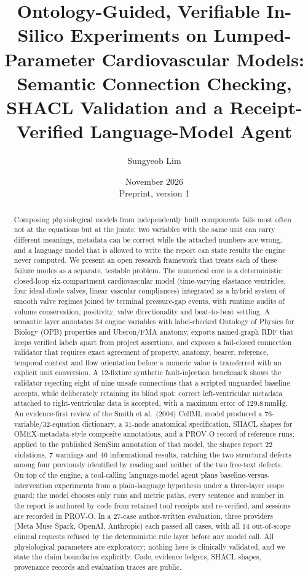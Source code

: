 \documentclass[11pt,letterpaper]{article}
\title{\textbf{Ontology-Guided, Verifiable In-Silico Experiments on Lumped-Parameter Cardiovascular Models:\\ Semantic Connection Checking, SHACL Validation and a Receipt-Verified Language-Model Agent}}
\author[1]{Sungyeob Lim}
\affil[1]{College of Medicine, Soonchunhyang University, Republic of Korea}
\date{November 2026 \\ \small Preprint, version 1}
\begin{document}
\maketitle

\begin{abstract}
Composing physiological models from independently built components fails most often not at the equations but at the joints: two variables with the same unit can carry different meanings, metadata can be correct while the attached numbers are wrong, and a language model that is allowed to write the report can state results the engine never computed. We present an open research framework that treats each of these failure modes as a separate, testable problem. The numerical core is a deterministic closed-loop six-compartment cardiovascular model (time-varying elastance ventricles, four ideal-diode valves, linear vascular compliances) integrated as a hybrid system of smooth valve regimes joined by terminal pressure-gap events, with runtime audits of volume conservation, positivity, valve directionality and beat-to-beat settling. A semantic layer annotates 34 engine variables with label-checked Ontology of Physics for Biology (OPB) properties and Uberon/FMA anatomy, exports named-graph RDF that keeps verified labels apart from project assertions, and exposes a fail-closed connection validator that requires exact agreement of property, anatomy, bearer, reference, temporal context and flow orientation before a numeric value is transferred with an explicit unit conversion. A 12-fixture synthetic fault-injection benchmark shows the validator rejecting eight of nine unsafe connections that a scripted unguarded baseline accepts, while deliberately retaining its blind spot: correct left-ventricular metadata attached to right-ventricular data is accepted, with a maximum error of 129.8\,mmHg. An evidence-first review of the Smith et al.\ (2004) CellML model produced a 76-variable/32-equation dictionary, a 31-node anatomical specification, SHACL shapes for OMEX-metadata-style composite annotations, and a PROV-O record of reference runs; applied to the published SemSim annotation of that model, the shapes report 22 violations, 7 warnings and 46 informational results, catching the two structural defects among four previously identified by reading and neither of the two free-text defects. On top of the engine, a tool-calling language-model agent plans baseline-versus-intervention experiments from a plain-language hypothesis under a three-layer scope guard; the model chooses only runs and metric paths, every sentence and number in the report is authored by code from retained tool receipts and re-verified, and sessions are recorded in PROV-O. In a 27-case author-written evaluation, three providers (Meta Muse Spark, OpenAI, Anthropic) each passed all cases, with all 14 out-of-scope clinical requests refused by the deterministic rule layer before any model call. All physiological parameters are exploratory; nothing here is clinically validated, and we state the claim boundaries explicitly. Code, evidence ledgers, SHACL shapes, provenance records and evaluation traces are public.
\end{abstract}
\end{document}
